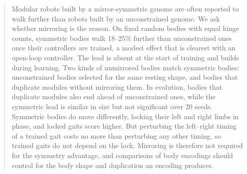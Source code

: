 \begin{abstract}
Modular robots built by a mirror-symmetric genome are often reported to walk further than robots built by an unconstrained genome. We ask whether mirroring is the reason. On fixed random bodies with equal hinge counts, symmetric bodies walk 18--25\% further than unconstrained ones once their controllers are trained, a modest effect that is clearest with an open-loop controller. The lead is absent at the start of training and builds during learning. Two kinds of unmirrored bodies match symmetric bodies: unconstrained bodies selected for the same resting shape, and bodies that duplicate modules without mirroring them. In evolution, bodies that duplicate modules also end ahead of unconstrained ones, while the symmetric lead is similar in size but not significant over 20 seeds. Symmetric bodies do move differently, locking their left and right limbs in phase, and locked gaits score higher. But perturbing the left--right timing of a trained gait costs no more than perturbing any other timing, so trained gaits do not depend on the lock. Mirroring is therefore not required for the symmetry advantage, and comparisons of body encodings should control for the body shape and duplication an encoding produces.
\end{abstract}
